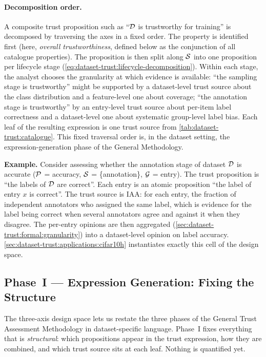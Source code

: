 \paragraph{Decomposition order.}
A composite trust proposition such as ``$\mathcal{D}$ is trustworthy for training'' is decomposed by traversing the axes in a fixed order. The property is identified first (here, \emph{overall trustworthiness}, defined below as the conjunction of all catalogue properties). The proposition is then split along $\mathcal{S}$ into one proposition per lifecycle stage (\cref{eq:dataset-trust:lifecycle-decomposition}). Within each stage, the analyst chooses the granularity at which evidence is available: ``the sampling stage is trustworthy'' might be supported by a dataset-level trust source about the class distribution and a feature-level one about coverage; ``the annotation stage is trustworthy'' by an entry-level trust source about per-item label correctness and a dataset-level one about systematic group-level label bias. Each leaf of the resulting expression is one trust source from \cref{tab:dataset-trust:catalogue}. This fixed traversal order is, in the dataset setting, the expression-generation phase of the General Methodology.

\begin{mdframed}[backgroundcolor=gray!10, linewidth=0pt]
\textbf{Example.} Consider assessing whether the annotation stage of dataset $\mathcal{D}$ is accurate ($\mathcal{P}$ = accuracy, $\mathcal{S}$ = \{annotation\}, $\mathcal{G}$ = entry). The trust proposition is ``the labels of $\mathcal{D}$ are correct''. Each entry is an atomic proposition ``the label of entry $x$ is correct''. The trust source is \acf{IAA}: for each entry, the fraction of independent annotators who assigned the same label, which is evidence for the label being correct when several annotators agree and against it when they disagree. The per-entry opinions are then aggregated (\cref{sec:dataset-trust:formal:granularity}) into a dataset-level opinion on label accuracy. \cref{sec:dataset-trust:applications:cifar10h} instantiates exactly this cell of the design space.
\end{mdframed}

\subsection{Phase~I --- Expression Generation: Fixing the Structure}
\label{sec:dataset-trust:framework:phase1}
The three-axis design space lets us restate the three phases of the General Trust Assessment Methodology in dataset-specific language. Phase~I fixes everything that is \emph{structural}: which propositions appear in the trust expression, how they are combined, and which trust source sits at each leaf. Nothing is quantified yet.

